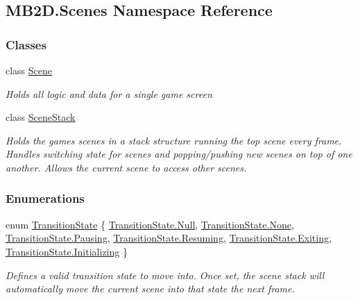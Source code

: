 \hypertarget{namespace_m_b2_d_1_1_scenes}{}\subsection{M\+B2\+D.\+Scenes Namespace Reference}
\label{namespace_m_b2_d_1_1_scenes}
\subsubsection*{Classes}
\begin{DoxyCompactItemize}
\item 
class \hyperlink{class_m_b2_d_1_1_scenes_1_1_scene}{Scene}
\begin{DoxyCompactList}\small\item\em Holds all logic and data for a single game screen \end{DoxyCompactList}\item 
class \hyperlink{class_m_b2_d_1_1_scenes_1_1_scene_stack}{Scene\+Stack}
\begin{DoxyCompactList}\small\item\em Holds the games scenes in a stack structure running the top scene every frame. Handles switching state for scenes and popping/pushing new scenes on top of one another. Allows the current scene to access other scenes. \end{DoxyCompactList}\end{DoxyCompactItemize}
\subsubsection*{Enumerations}
\begin{DoxyCompactItemize}
\item 
enum \hyperlink{namespace_m_b2_d_1_1_scenes_a0e0db3f97bbaa272f70534c5954c4acc}{Transition\+State} \{ \newline
\hyperlink{namespace_m_b2_d_1_1_scenes_a0e0db3f97bbaa272f70534c5954c4accabbb93ef26e3c101ff11cdd21cab08a94}{Transition\+State.\+Null}, 
\hyperlink{namespace_m_b2_d_1_1_scenes_a0e0db3f97bbaa272f70534c5954c4acca6adf97f83acf6453d4a6a4b1070f3754}{Transition\+State.\+None}, 
\hyperlink{namespace_m_b2_d_1_1_scenes_a0e0db3f97bbaa272f70534c5954c4accaf89bf2973f11fc8bac3db5669252725a}{Transition\+State.\+Pausing}, 
\hyperlink{namespace_m_b2_d_1_1_scenes_a0e0db3f97bbaa272f70534c5954c4acca69f55169cdb3caab27ba9f347bf05354}{Transition\+State.\+Resuming}, 
\newline
\hyperlink{namespace_m_b2_d_1_1_scenes_a0e0db3f97bbaa272f70534c5954c4acca0657d962b72e6f1f37dda8dad3684cb8}{Transition\+State.\+Exiting}, 
\hyperlink{namespace_m_b2_d_1_1_scenes_a0e0db3f97bbaa272f70534c5954c4acca32b169f72b293ef80d35435e9894f8e2}{Transition\+State.\+Initializing}
 \}\begin{DoxyCompactList}\small\item\em Defines a valid transition state to move into. Once set, the scene stack will automatically move the current scene into that state the next frame. \end{DoxyCompactList}
\end{DoxyCompactItemize}


